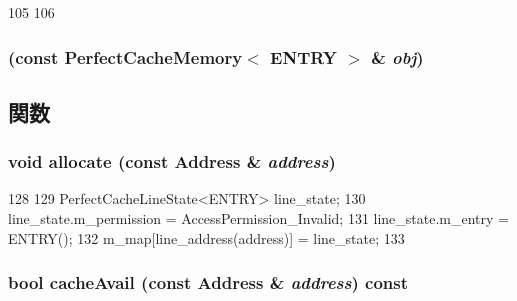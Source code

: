 \begin{DoxyCode}
105 {
106 }
\end{DoxyCode}
\hypertarget{classPerfectCacheMemory_a3bdf2c56b3085371e93f3669780fa026}{
\subsubsection[{PerfectCacheMemory}]{ (const {\bf PerfectCacheMemory}$<$ ENTRY $>$ \& {\em obj})}}
\label{classPerfectCacheMemory_a3bdf2c56b3085371e93f3669780fa026}


\subsection{関数}
\hypertarget{classPerfectCacheMemory_a5b0f65e7d424629299a1ade3553e5bc1}{
\subsubsection[{allocate}]{\setlength{\rightskip}{0pt plus 5cm}void allocate (const {\bf Address} \& {\em address})}}
\label{classPerfectCacheMemory_a5b0f65e7d424629299a1ade3553e5bc1}



\begin{DoxyCode}
128 {
129     PerfectCacheLineState<ENTRY> line_state;
130     line_state.m_permission = AccessPermission_Invalid;
131     line_state.m_entry = ENTRY();
132     m_map[line_address(address)] = line_state;
133 }
\end{DoxyCode}
\hypertarget{classPerfectCacheMemory_add6ef1702fc19966e797bbebabf3cefa}{
\subsubsection[{cacheAvail}]{\setlength{\rightskip}{0pt plus 5cm}bool cacheAvail (const {\bf Address} \& {\em address}) const}}
\label{classPerfectCacheMemory_add6ef1702fc19966e797bbebabf3cefa}



